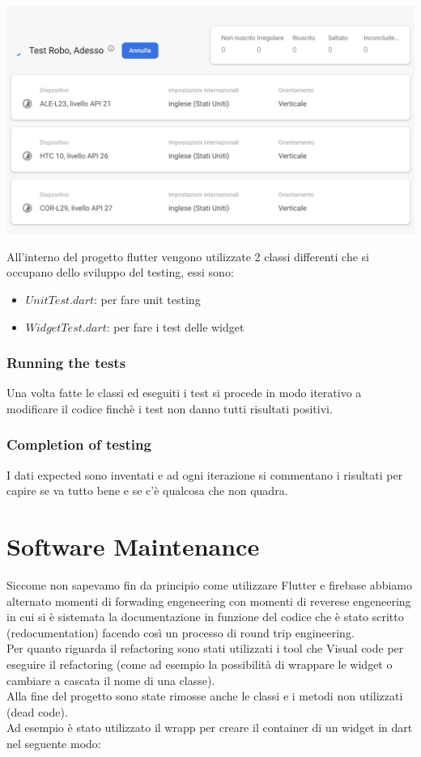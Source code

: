 \documentclass{article}
\begin{document}
\\\includegraphics[scale = 0.45]{"Immagini/Firebase_testing.PNG"}

All'interno del progetto flutter vengono utilizzate 2 classi differenti che si occupano dello 
sviluppo del testing, essi sono:
\begin{itemize}
    \item $UnitTest.dart$: per fare unit testing
    \item $WidgetTest.dart$: per fare i test delle widget
\end{itemize}

\subsubsection{Running the tests}
Una volta fatte le classi ed eseguiti i test si procede in modo iterativo a modificare il codice
finchè i test non danno tutti risultati positivi. 

\subsubsection{Completion of testing}
I dati expected sono inventati e ad ogni iterazione si commentano i risultati per capire 
se va tutto bene e se c'è qualcosa che non quadra.

\newpage
\section{Software Maintenance}
Siccome non sapevamo fin da principio come utilizzare Flutter e firebase abbiamo alternato momenti di forwading engeneering con momenti di reverese
engeneering in cui si è sistemata la documentazione in funzione del codice che è stato scritto (redocumentation) facendo così un processo
di round trip engineering.
\\Per quanto riguarda il refactoring sono stati utilizzati i tool che Visual code per eseguire il refactoring (come ad esempio 
la possibilità di wrappare le widget o cambiare a cascata il nome di una classe).
\\Alla fine del progetto sono state rimosse anche le classi e i metodi non utilizzati (dead code).
\\Ad esempio è stato utilizzato il wrapp per creare il container di un widget in dart nel seguente modo:
\end{document}

